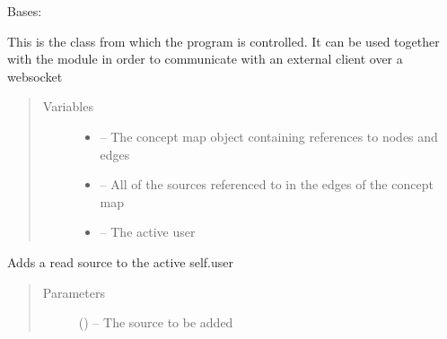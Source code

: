 \documentclass[letterpaper,10pt,english]{sphinxmanual}
\begin{document}
\begin{fulllineitems}
\label{\detokenize{consumer:consumer.Consumer}}
Bases: \href{https://docs.python.org/2/library/functions.html\#object}{}

This is the class from which the program is controlled. It can be used together with the {\hyperref[\detokenize{handler:module-handler}]{}} module in order to communicate with an external client over a websocket
\begin{quote}\begin{description}
\item[{Variables}] \leavevmode\begin{itemize}
\item {} 
{\hyperref[\detokenize{concept_map:module-concept_map}]{}} -- The concept map object containing references to nodes and edges

\item {} 
 -- All of the sources referenced to in the edges of the concept map

\item {} 
{\hyperref[\detokenize{user:module-user}]{}} -- The active user

\end{itemize}

\end{description}\end{quote}

\begin{fulllineitems}
\label{\detokenize{consumer:consumer.Consumer.add_source}}
Adds a read source to the active self.user
\begin{quote}\begin{description}
\item[{Parameters}] \leavevmode
{} (\href{https://docs.python.org/2/library/string.html\#module-string}{}) -- The source to be added

\end{description}\end{quote}

\end{fulllineitems}


\end{fulllineitems}
\end{document}
